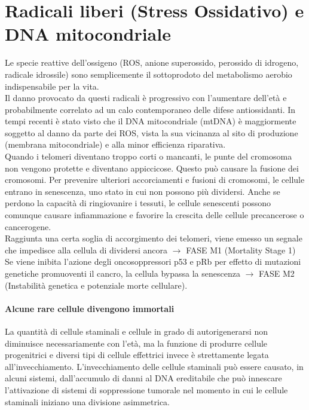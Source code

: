 \documentclass{article}
\begin{document}
\section{Radicali liberi (Stress Ossidativo) e DNA mitocondriale} Le specie reattive dell'ossigeno (ROS, anione superossido, perossido di idrogeno, radicale idrossile) sono semplicemente il sottoprodoto del metabolismo aerobio indispensabile per la vita.\\
Il danno provocato da questi radicali è progressivo con l'aumentare dell'età e probabilmente correlato ad un calo contemporaneo delle difese antiossidanti.
In tempi recenti è stato visto che il DNA mitocondriale (mtDNA) è maggiormente soggetto al danno da parte dei ROS, vista la sua vicinanza al sito di produzione (membrana mitocondriale) e alla minor efficienza riparativa.\\
Quando i telomeri diventano troppo corti o mancanti, le punte del cromosoma non vengono protette e diventano appiccicose. Questo può causare la fusione dei cromosomi. Per prevenire ulteriori accorciamenti e fusioni di cromosomi, le cellule entrano in senescenza, uno stato in cui non possono più dividersi. Anche se perdono la capacità di ringiovanire i tessuti, le cellule senescenti possono comunque causare infiammazione e favorire la crescita delle cellule precancerose o cancerogene.\\
Raggiunta una certa soglia di accorgimento dei telomeri, viene emesso un segnale che impedisce alla cellula di dividersi ancora  $\rightarrow$ FASE M1 (Mortality Stage 1)\\
Se viene inibita l'azione degli oncosoppressori p53 e pRb per effetto di mutazioni genetiche promuoventi il cancro, la cellula bypassa la senescenza $\rightarrow$ FASE M2 (Instabilità genetica e potenziale morte cellulare).
\paragraph{Alcune rare cellule divengono immortali}
La quantità di cellule staminali e cellule in grado di autorigenerarsi non diminuisce necessariamente con l'età, ma la funzione di produrre cellule progenitrici e diversi tipi di cellule effettrici invece è strettamente legata all'invecchiamento. L'invecchiamento delle cellule staminali può essere causato, in alcuni sistemi, dall'accumulo di danni al DNA ereditabile che può innescare l'attivazione di sistemi di soppressione tumorale nel momento in cui le cellule staminali iniziano una divisione asimmetrica.\\
\end{document}
